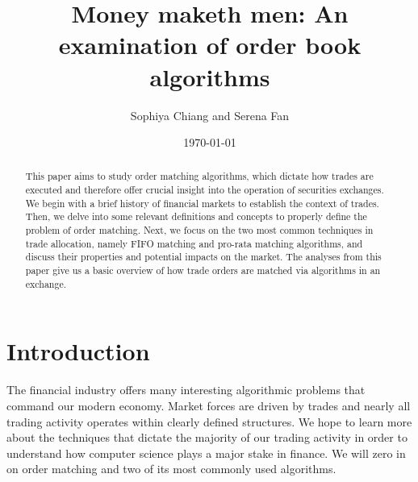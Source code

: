 \documentclass{article}
\begin{document}
	
	\title{Money maketh men: An examination of order book algorithms}
	\author{Sophiya Chiang and Serena Fan}
	
\date{\today}

\maketitle

\begin{abstract}
This paper aims to study order matching algorithms, which dictate how trades are executed and therefore offer crucial insight into the operation of securities exchanges. We begin with a brief history of financial markets to establish the context of trades. Then, we delve into some relevant definitions and concepts to properly define the problem of order matching. Next, we focus on the two most common techniques in trade allocation, namely FIFO matching and pro-rata matching algorithms, and discuss their properties and potential impacts on the market. The analyses from this paper give us a basic overview of how trade orders are matched via algorithms in an exchange.
\end{abstract}

\section{Introduction}

The financial industry offers many interesting algorithmic problems that command our modern economy. Market forces are driven by trades and nearly all  trading activity operates within clearly defined structures. We hope to learn more about the techniques that dictate the majority of our trading activity in order to understand how computer science plays a major stake in finance. We will zero in on order matching and two of its most commonly used algorithms.
\end{document}
